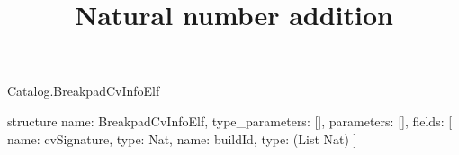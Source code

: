 \begin{lexlean}{Catalog.BreakpadCvInfoElf}
\title{Natural number addition}
\begin{semanticmodule}
structure{
  name: BreakpadCvInfoElf,
  type_parameters: [],
  parameters: [],
  fields: [
    {name: cvSignature, type: Nat},
    {name: buildId, type: (List Nat)}
  ]
}
\end{semanticmodule}
\end{lexlean}
